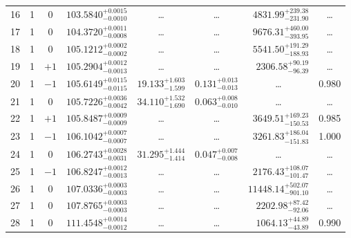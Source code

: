 \begin{table*}[!]
\begin{tabular}{llcrrlrc}
16 & 1 & 0 & $    103.5840_{-      0.0010}^{+      0.0015}$ & \multicolumn{1}{c}{\dots} & \multicolumn{1}{c}{\dots} & $     4831.99_{-      231.90}^{+      239.38}$ & \dots \\[1pt]
17 & 1 & 0 & $    104.3720_{-      0.0008}^{+      0.0011}$ & \multicolumn{1}{c}{\dots} & \multicolumn{1}{c}{\dots} & $     9676.31_{-      393.95}^{+      460.00}$ & \dots \\[1pt]
18 & 1 & 0 & $    105.1212_{-      0.0002}^{+      0.0002}$ & \multicolumn{1}{c}{\dots} & \multicolumn{1}{c}{\dots} & $     5541.50_{-      188.93}^{+      191.29}$ & \dots \\[1pt]
19 & 1 & $+1$ & $    105.2904_{-      0.0013}^{+      0.0012}$ & \multicolumn{1}{c}{\dots} & \multicolumn{1}{c}{\dots} & $     2306.58_{-       96.39}^{+       90.19}$ & \dots \\[1pt]
20 & 1 & $-1$ & $    105.6149_{-      0.0115}^{+      0.0115}$ & $      19.133_{-       1.599}^{+       1.603}$ & $       0.131_{-       0.013}^{+       0.013}$ & \multicolumn{1}{c}{\dots} & 0.980 \\[1pt]
21 & 1 & 0 & $    105.7226_{-      0.0042}^{+      0.0036}$ & $      34.110_{-       1.690}^{+       1.532}$ & $       0.063_{-       0.010}^{+       0.008}$ & \multicolumn{1}{c}{\dots} & \dots \\[1pt]
22 & 1 & $+1$ & $    105.8487_{-      0.0009}^{+      0.0009}$ & \multicolumn{1}{c}{\dots} & \multicolumn{1}{c}{\dots} & $     3649.51_{-      150.53}^{+      169.23}$ & 0.985\\[1pt]
23 & 1 & $-1$ & $    106.1042_{-      0.0007}^{+      0.0007}$ & \multicolumn{1}{c}{\dots} & \multicolumn{1}{c}{\dots} & $     3261.83_{-      151.83}^{+      186.04}$ & 1.000\\[1pt]
24 & 1 & 0 & $    106.2743_{-      0.0031}^{+      0.0028}$ & $      31.295_{-       1.414}^{+       1.444}$ & $       0.047_{-       0.008}^{+       0.007}$ & \multicolumn{1}{c}{\dots} & \dots \\[1pt]
25 & 1 & $-1$ & $    106.8247_{-      0.0013}^{+      0.0012}$ & \multicolumn{1}{c}{\dots} & \multicolumn{1}{c}{\dots} & $     2176.43_{-      101.47}^{+      108.07}$ & \dots \\[1pt]
26 & 1 & 0 & $    107.0336_{-      0.0003}^{+      0.0003}$ & \multicolumn{1}{c}{\dots} & \multicolumn{1}{c}{\dots} & $    11448.14_{-      901.10}^{+      502.07}$ & \dots \\[1pt]
27 & 1 & 0 & $    107.8765_{-      0.0003}^{+      0.0003}$ & \multicolumn{1}{c}{\dots} & \multicolumn{1}{c}{\dots} & $     2202.98_{-       92.06}^{+       87.42}$ & \dots \\[1pt]
28 & 1 & 0 & $    111.4548_{-      0.0012}^{+      0.0014}$ & \multicolumn{1}{c}{\dots} & \multicolumn{1}{c}{\dots} & $     1064.13_{-       43.89}^{+       44.89}$ & 0.990\\[1pt]


\end{tabular}
\end{table*}
